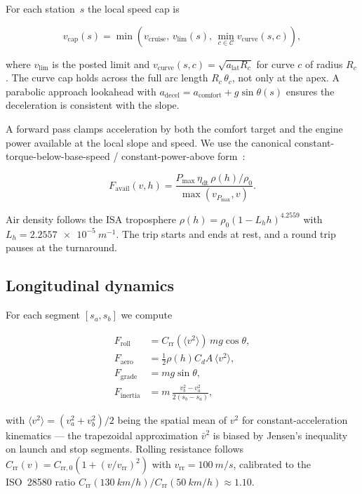 \documentclass[11pt,a4paper]{article}
\begin{document}
For each station~$s$ the local speed cap is

\begin{equation}
v_{\text{cap}}(s) = \min\!\left( v_{\text{cruise}},\, v_{\text{lim}}(s),\,
  \min_{c \in \mathcal{C}} v_{\text{curve}}(s, c) \right),
\end{equation}

where $v_{\text{lim}}$ is the posted limit and $v_{\text{curve}}(s,c)
= \sqrt{a_{\text{lat}} R_c}$ for curve $c$ of radius $R_c$. The curve
cap holds across the full arc length $R_c \, \theta_c$, not only at
the apex. A parabolic approach lookahead with
$a_{\text{decel}} = a_{\text{comfort}} + g \sin\theta(s)$ ensures the
deceleration is consistent with the slope.

A forward pass clamps acceleration by both the comfort target and the
engine power available at the local slope and speed. We use the
canonical constant-torque-below-base-speed / constant-power-above
form~\cite{heywood2018}:

\begin{equation}
F_{\text{avail}}(v, h) = \frac{P_{\max} \,\eta_{\text{dt}} \, \rho(h)/\rho_0}
                              {\max(v_{P_{\max}}, v)}.
\end{equation}

Air density follows the ISA troposphere
$\rho(h) = \rho_0 (1 - L_h h)^{4.2559}$ with $L_h =
\SI{2.2557e-5}{m^{-1}}$. The trip starts and ends at rest, and a round
trip pauses at the turnaround.

\subsection{Longitudinal dynamics}

For each segment $[s_a, s_b]$ we compute

\begin{align}
F_{\text{roll}} &= C_{\text{rr}}(\langle v^2 \rangle) \, m g \cos\theta, \\
F_{\text{aero}} &= \tfrac{1}{2} \rho(h) C_d A \,\langle v^2 \rangle, \\
F_{\text{grade}} &= m g \sin\theta, \\
F_{\text{inertia}} &= m \, \frac{v_b^2 - v_a^2}{2(s_b - s_a)},
\end{align}

with $\langle v^2 \rangle = (v_a^2 + v_b^2)/2$ being the spatial mean
of $v^2$ for constant-acceleration kinematics --- the trapezoidal
approximation $\bar{v}^2$ is biased by Jensen's inequality on launch
and stop segments. Rolling resistance follows
$C_{\text{rr}}(v) = C_{\text{rr},0} (1 + (v / v_{\text{rr}})^2)$ with
$v_{\text{rr}} = \SI{100}{m/s}$, calibrated to the ISO~28580 ratio
$C_{\text{rr}}(\SI{130}{km/h}) / C_{\text{rr}}(\SI{50}{km/h}) \approx
1.10$.
\end{document}
